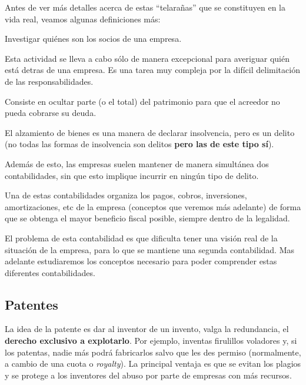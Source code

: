 \documentclass[nochap,palatino,shortheader]{apuntes}
\newcommand{\study}[1]{#1} \newcommand{\substudy}[1]{#1}
\begin{document}
Antes de ver más detalles acerca de estas ``telarañas'' que se constituyen en la vida real, veamos algunas definiciones más:

\begin{defn}
Investigar \study{quiénes son los socios de una empresa}.

Esta actividad se lleva a cabo sólo de manera excepcional para averiguar quién está detras de una empresa. Es una tarea muy compleja por la \study{difícil delimitación} de las responsabilidades.
\end{defn}

\begin{defn}
Consiste en \study{ocultar} parte (o el total) del \study{patrimonio} para que \substudy{el acreedor no pueda cobrarse su deuda}.

El alzamiento de bienes es una manera de declarar insolvencia, pero es un \study{delito} (no todas las formas de insolvencia son delitos \textbf{pero las de este tipo sí}).
\end{defn}

Además de esto, las empresas suelen mantener de manera simultánea dos contabilidades, sin que esto implique incurrir en ningún tipo de delito.

Una de estas contabilidades organiza los pagos, cobros, inversiones, amortizaciones, etc de la empresa (conceptos que veremos más adelante) de forma que se obtenga el mayor beneficio fiscal posible, siempre dentro de la legalidad.

El problema de esta contabilidad es que dificulta tener una visión real de la situación de la empresa, para lo que se mantiene una segunda contabilidad. Mas adelante estudiaremos los conceptos necesario para poder comprender estas diferentes contabilidades.


\subsection{Patentes}

La idea de la patente es dar al inventor de un invento, valga la redundancia, el \study{\textbf{derecho exclusivo a explotarlo}}. Por ejemplo, inventas firulillos voladores y, si los patentas, nadie más podrá fabricarlos \substudy{salvo} que les des permiso (normalmente, a cambio de una cuota o \textit{\substudy{royalty}}). La principal ventaja es que se evitan los plagios y se protege a los inventores del abuso por parte de empresas con más recursos.
\end{document}
